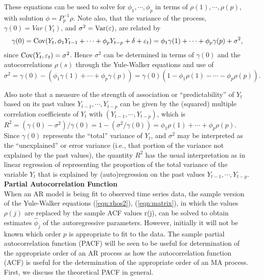 These equations can be used to solve for $\phi_1,\cdots,\phi_p$ in terms of $\rho(1),\cdots,\rho(p)$, with solution $\phi = P_p^{-1}\rho$. Note also, that the variance of the process, $\gamma(0) = Var(Y_t)$, and $\sigma^2= \operatorname{Var}(\varepsilon)$, are related by
	\[
	\gamma(0)= \operatorname{Cov}(Y_t, \phi_1Y_{t-1} + \cdots + \phi_pY_{t-p} + \delta + \varepsilon_t)= \phi_1\gamma(1) + \cdots + \phi_p\gamma(p) + \sigma^2,
	\]
since $\operatorname{Cov}(Y_t, \varepsilon_t)= \sigma^2$. Hence $\sigma^2$ can be determined in terms of $\gamma(0)$ and the autocorrelations $\rho(s)$ through the Yule-Walker equations and use of
	\begin{equation}\label{eqn:ssquared}
	 \sigma^2 = \gamma(0) - (\phi_1\gamma(1) + \cdots + \phi_p\gamma(p)) = \gamma(0)(1 - \phi_1\rho(1) - \cdots - \phi_p\rho(p)).
	\end{equation}


Also note that a measure of the strength of association or ``predictability'' of $Y_t$ based on its past values $Y_{t-1},\cdots,Y_{t-p}$ can be given by the (squared) multiple correlation coefficients of $Y_t$ with $(Y_{t-1},\cdots,Y_{t-p})$, which is $R^2= (\gamma(0) - \sigma^2)/\gamma(0) = 1 - (\sigma^2/\gamma(0)) = \phi_1\rho(1) + \cdots + \phi_p\rho(p)$. Since $\gamma(0)$ represents the ``total'' variance of $Y_t$, and $\sigma^2$ may be interpreted as the ``unexplained'' or error variance (i.e., that portion of the variance not explained by the past values), the quantity $R^2$ has the usual interpretation as in linear regression of representing the proportion of the total variance of the variable $Y_t$ that is explained by (auto)regression on the past values $Y_{t-1},\cdots,Y_{t-p}$. \\


\noindent\textbf{Partial Autocorrelation Function} \\


When an AR model is being fit to observed time series data, the sample version of the Yule-Walker equations (\ref{eqn:rhos2}), (\ref{eqn:matrix}), in which the values $\rho(j)$ are replaced by the sample ACF values r(j), can be solved to obtain estimates $\hat{\phi}_j$ of the autoregressive parameters. However, initially it will not be known which order $p$ is appropriate to fit to the data. The sample partial autocorrelation function (PACF) will be seen to be useful for determination of the appropriate order of an AR process as how the autocorrelation function (ACF) is useful for the determination of the appropriate order of an MA process. First, we discuss the theoretical PACF in general.


